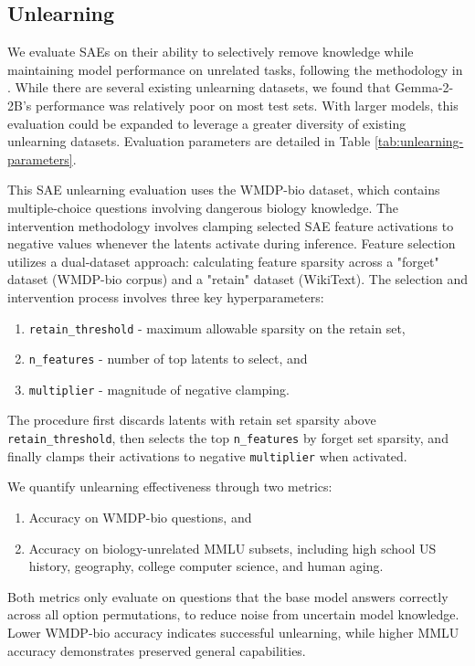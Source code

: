 \documentclass{article}
\theoremstyle{plain}
\theoremstyle{definition}
\theoremstyle{remark}
\begin{document}
\subsection*{Unlearning}

We evaluate SAEs on their ability to selectively remove knowledge while maintaining model performance on unrelated tasks, following the methodology in \citet{farrell2024applyingsparseautoencodersunlearn}. While there are several existing unlearning datasets, we found that Gemma-2-2B's performance was relatively poor on most test sets. With larger models, this evaluation could be expanded to leverage a greater diversity of existing unlearning datasets. Evaluation parameters are detailed in Table \ref{tab:unlearning-parameters}.

This SAE unlearning evaluation uses the WMDP-bio dataset, which contains multiple-choice questions involving dangerous biology knowledge. The intervention methodology involves clamping selected SAE feature activations to negative values whenever the latents activate during inference. Feature selection utilizes a dual-dataset approach: calculating feature sparsity across a "forget" dataset (WMDP-bio corpus) and a "retain" dataset (WikiText). The selection and intervention process involves three key hyperparameters:
\begin{enumerate}
    \item \texttt{retain\_threshold} - maximum allowable sparsity on the retain set,
    \item \texttt{n\_features} - number of top latents to select, and
    \item \texttt{multiplier} - magnitude of negative clamping.
\end{enumerate}
The procedure first discards latents with retain set sparsity above \texttt{retain\_threshold}, then selects the top \texttt{n\_features} by forget set sparsity, and finally clamps their activations to negative \texttt{multiplier} when activated.

We quantify unlearning effectiveness through two metrics:
\begin{enumerate}
    \item Accuracy on WMDP-bio questions, and
    \item Accuracy on biology-unrelated MMLU subsets, including high school US history, geography, college computer science, and human aging.
\end{enumerate}
Both metrics only evaluate on questions that the base model answers correctly across all option permutations, to reduce noise from uncertain model knowledge. Lower WMDP-bio accuracy indicates successful unlearning, while higher MMLU accuracy demonstrates preserved general capabilities. 
\end{document}

